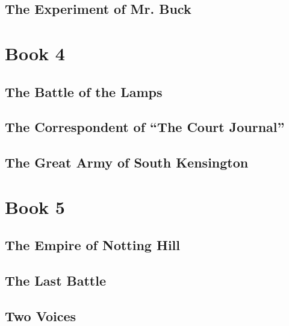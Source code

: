\documentclass{book}
\begin{document}
\chapter{The Experiment of Mr. Buck}
\label{chapter-11}
\setcounter{chapter}{0}\part*{Book 4}
\label{chapter-12}
\chapter{The Battle of the Lamps}
\label{chapter-13}
\chapter{The Correspondent of “The Court Journal”}
\label{chapter-14}
\chapter{The Great Army of South Kensington}
\label{chapter-15}
\setcounter{chapter}{0}\part*{Book 5}
\label{chapter-16}
\chapter{The Empire of Notting Hill}
\label{chapter-17}
\chapter{The Last Battle}
\label{chapter-18}
\chapter{Two Voices}
\label{chapter-19}
\end{document}
